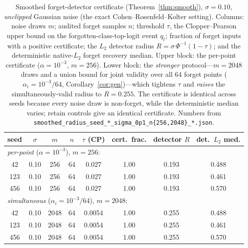 \documentclass{article}
\begin{document}
\begin{table}[t]
  \centering
  \small
  \setlength{\tabcolsep}{5pt}
  \begin{tabular}{c c c c c c c c}
    \toprule
    seed & $\sigma$ & $m$ & $n$ & $\tau$ (CP) & cert.\ frac. & detector $R$ & det.\ $L_2$ med. \\
    \midrule
    \multicolumn{8}{l}{\emph{per-point} ($\alpha = 10^{-3}$), $m=256$:} \\
    42  & 0.10 & 256 & 64 & 0.027 & 1.00 & 0.193 & 0.488 \\
    123 & 0.10 & 256 & 64 & 0.027 & 1.00 & 0.193 & 0.461 \\
    456 & 0.10 & 256 & 64 & 0.027 & 1.00 & 0.193 & 0.570 \\
    \midrule
    \multicolumn{8}{l}{\emph{simultaneous} ($\alpha_i = 10^{-3}/64$), $m=2048$:} \\
    42  & 0.10 & 2048 & 64 & 0.0054 & 1.00 & 0.255 & 0.488 \\
    123 & 0.10 & 2048 & 64 & 0.0054 & 1.00 & 0.255 & 0.461 \\
    456 & 0.10 & 2048 & 64 & 0.0054 & 1.00 & 0.255 & 0.570 \\
    \bottomrule
  \end{tabular}
  \caption{Smoothed forget-detector certificate (Theorem~\ref{thm:smooth}), $\sigma = 0.10$, \emph{unclipped} Gaussian noise (the exact Cohen--Rosenfeld--Kolter setting). Columns: noise draws $m$; audited forget samples $n$; threshold $\tau$, the Clopper--Pearson upper bound on the forgotten-class-top-logit event $q_t$; fraction of forget inputs with a positive certificate; the $L_2$ detector radius $R = \sigma\,\Phi^{-1}(1-\tau)$; and the deterministic native-$L_2$ forget recovery median. Upper block: the per-point certificate ($\alpha=10^{-3}$, $m=256$). Lower block: the \emph{stronger} protocol---$m=2048$ draws and a union bound for joint validity over all $64$ forget points ($\alpha_i=10^{-3}/64$, Corollary~\ref{cor:gen})---which tightens $\tau$ and \emph{raises} the simultaneously-valid radius to $R=0.255$. The certificate is identical across seeds because every noise draw is non-forget, while the deterministic median varies; retain controls give an identical certificate. Numbers from \texttt{smoothed\_radius\_seed\_*\_sigma\_0p1\_n\{256,2048\}\_*.json}.}
  \label{tab:cert}
\end{table}
\end{document}
